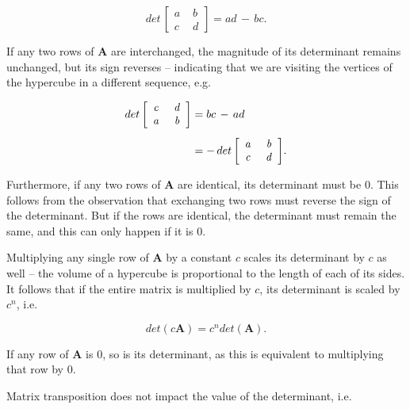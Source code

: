 \documentclass[graybox,envcountchap,sectrefs]{svmono}\usepackage[]{graphicx}\usepackage[]{xcolor}
\begin{document}
\begin{appendices}
\begin{equation}
det\mathrm{\,\left[\begin{array}{cc}
\mathit{a}\, & \,\mathit{b}\\
\mathit{c}\, & \,\mathit{d}
\end{array}\right]}=ad\,-\,bc.\label{eq:Det2by2}
\end{equation}

If any two rows of $\mathrm{\mathbf{A}}$ are interchanged, the magnitude
of its determinant remains unchanged, but its sign reverses -- indicating
that we are visiting the vertices of the hypercube in a different
sequence, e.g.

\begin{align}
det\mathrm{\,\left[\begin{array}{cc}
\mathit{c}\, & \,\mathit{d}\\
\mathit{a}\, & \text{\,}\mathit{b}
\end{array}\right]} & =bc\,-\,ad\nonumber \\[0.5em]
 & =-\,det\mathrm{\,\left[\begin{array}{cc}
\mathit{a}\, & \,\mathit{b}\\
\mathit{c}\, & \,\mathit{d}
\end{array}\right]}.\label{eq:RowExchange2by2}
\end{align}

Furthermore, if any two rows of $\mathrm{\mathbf{A}}$ are identical,
its determinant must be 0. This follows from the observation that
exchanging two rows must reverse the sign of the determinant. But
if the rows are identical, the determinant must remain the same, and
this can only happen if it is 0.

Multiplying any single row of $\mathrm{\mathbf{A}}$ by a constant
$c$ scales its determinant by $c$ as well -- the volume of a hypercube
is proportional to the length of each of its sides. It follows that
if the entire matrix is multiplied by $c$, its determinant is scaled
by $c^{n}$, i.e.

\begin{equation}
det\left(c\mathrm{\mathbf{A}}\right)=c^{n}det\left(\mathrm{\mathbf{A}}\right).\label{eq:ScaledMatixDeterminant}
\end{equation}

If any row of $\mathrm{\mathbf{A}}$ is 0, so is its determinant,
as this is equivalent to multiplying that row by 0.

Matrix transposition does not impact the value of the determinant,
i.e.


\end{appendices}
\end{document}
